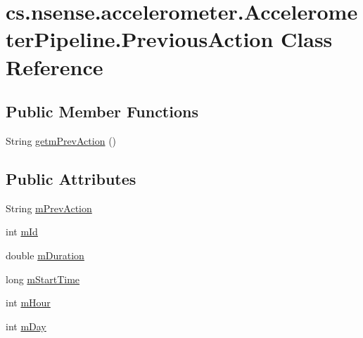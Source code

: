 \hypertarget{classcs_1_1nsense_1_1accelerometer_1_1_accelerometer_pipeline_1_1_previous_action}{\section{cs.\-nsense.\-accelerometer.\-Accelerometer\-Pipeline.\-Previous\-Action Class Reference}
\label{classcs_1_1nsense_1_1accelerometer_1_1_accelerometer_pipeline_1_1_previous_action}
}
\subsection*{Public Member Functions}
\begin{DoxyCompactItemize}
\item 
String \hyperlink{classcs_1_1nsense_1_1accelerometer_1_1_accelerometer_pipeline_1_1_previous_action_a2cdeaa6a9ad8791ba0f410458c8007cd}{getm\-Prev\-Action} ()
\end{DoxyCompactItemize}
\subsection*{Public Attributes}
\begin{DoxyCompactItemize}
\item 
String \hyperlink{classcs_1_1nsense_1_1accelerometer_1_1_accelerometer_pipeline_1_1_previous_action_a00517e595a67132cbfe7eb5a77fe6902}{m\-Prev\-Action}
\item 
int \hyperlink{classcs_1_1nsense_1_1accelerometer_1_1_accelerometer_pipeline_1_1_previous_action_a6a48100cb4f02e7d2a7b75d32972da4e}{m\-Id}
\item 
double \hyperlink{classcs_1_1nsense_1_1accelerometer_1_1_accelerometer_pipeline_1_1_previous_action_a3dd9e79f47cf2d6deef3c0d6bdb19cdf}{m\-Duration}
\item 
long \hyperlink{classcs_1_1nsense_1_1accelerometer_1_1_accelerometer_pipeline_1_1_previous_action_af8eeb4d2e92eb3b178c179008c81ac96}{m\-Start\-Time}
\item 
int \hyperlink{classcs_1_1nsense_1_1accelerometer_1_1_accelerometer_pipeline_1_1_previous_action_a63e9a9d685f62dc30be52f57cbe9b6c3}{m\-Hour}
\item 
int \hyperlink{classcs_1_1nsense_1_1accelerometer_1_1_accelerometer_pipeline_1_1_previous_action_a42a6c759aabb6402a75c8482bd921be7}{m\-Day}
\end{DoxyCompactItemize}


